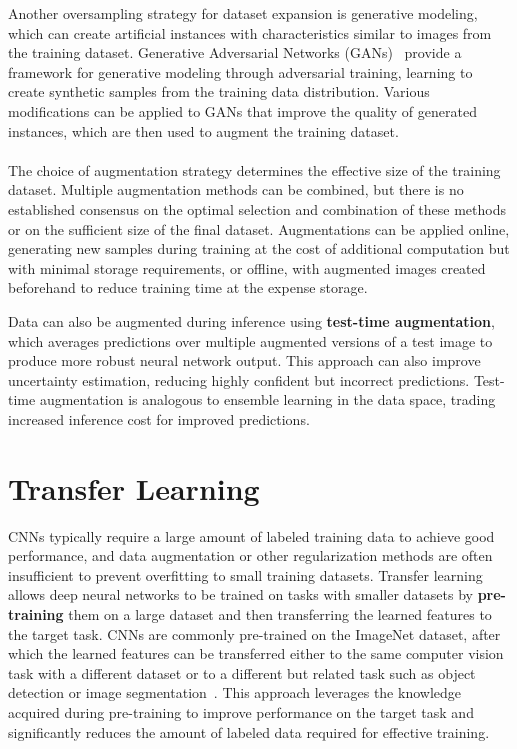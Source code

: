 Another oversampling strategy for dataset expansion is generative modeling, which can create artificial instances with characteristics similar to images from the training dataset. Generative Adversarial Networks (GANs)~\cite{Goodfellow2014} provide a framework for generative modeling through adversarial training, learning to create synthetic samples from the training data distribution. Various modifications can be applied to GANs that improve the quality of generated instances, which are then used to augment the training dataset.~\cite{Shorten2019, Yang2023}

\paragraph{} The choice of augmentation strategy determines the effective size of the training dataset. Multiple augmentation methods can be combined, but there is no established consensus on the optimal selection and combination of these methods or on the sufficient size of the final dataset. Augmentations can be applied online, generating new samples during training at the cost of additional computation but with minimal storage requirements, or offline, with augmented images created beforehand to reduce training time at the expense storage.

Data can also be augmented during inference using \textbf{test-time augmentation}, which averages predictions over multiple augmented versions of a test image to produce more robust neural network output. This approach can also improve uncertainty estimation, reducing highly confident but incorrect predictions. Test-time augmentation is analogous to ensemble learning in the data space, trading increased inference cost for improved predictions.~\cite{Shorten2019, Yang2023}


\section{Transfer Learning}
CNNs typically require a large amount of labeled training data to achieve good performance, and data augmentation or other regularization methods are often insufficient to prevent overfitting to small training datasets. Transfer learning allows deep neural networks to be trained on tasks with smaller datasets by \textbf{pre-training} them on a large dataset and then transferring the learned features to the target task. CNNs are commonly pre-trained on the ImageNet dataset, after which the learned features can be transferred either to the same computer vision task with a different dataset or to a different but related task such as object detection or image segmentation~\cite{Kornblith2019}. This approach leverages the knowledge acquired during pre-training to improve performance on the target task and significantly reduces the amount of labeled data required for effective training.~\cite{Krichen2023}

